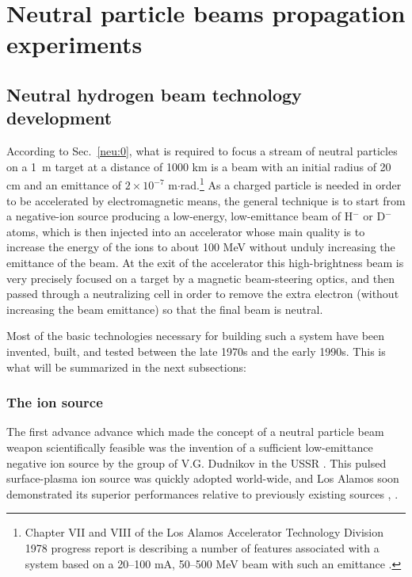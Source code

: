 \documentclass [12pt,a4paper,     ]{report} %
\begin{document}
\chapter{Neutral particle beams propagation experiments}
\label{npb:0}


\section{Neutral hydrogen beam technology development}
\label{nhb:0}

According to Sec.~\ref{neu:0}, what is required to focus a stream of neutral particles on a 1~m target at a distance of 1000 km is a beam with an initial radius of 20 cm and an emittance of $2 \times 10^{-7}$ m$\cdot$rad.\footnote{Chapter VII and VIII of the Los Alamos Accelerator Technology Division 1978 progress report is describing a number of features associated with a system based on a 20--100 mA, 50--500 MeV beam with such an emittance \cite[p.24-77]{KNAPP1980-}.} As a charged particle is needed in order to be accelerated by electromagnetic means, the general technique is to start from a negative-ion source producing a low-energy,  low-emittance beam of H$^-$ or D$^-$ atoms, which is then injected into an accelerator whose main quality is to increase the energy of the ions to about 100 MeV without unduly increasing the emittance of the beam.  At the exit of the accelerator this high-brightness beam is very precisely focused on a target by a magnetic beam-steering optics, and then passed through a neutralizing cell in order to remove the extra electron (without increasing the beam emittance) so that the final beam is neutral.

Most of the basic technologies necessary for building such a system have been invented, built, and tested between the late 1970s and the early 1990s.  This is what will be summarized in the next subsections:



\subsection{The ion source}

 The first advance advance which made the concept of a neutral particle beam weapon scientifically feasible was the invention of a sufficient low-emittance negative ion source by the group of V.G. Dudnikov in the USSR \cite{DUDNI1974-, DIMOV1977-}.  This pulsed surface-plasma ion source was quickly adopted world-wide, and Los Alamos soon demonstrated its superior performances relative to previously existing sources \cite[p.117]{KNAPP1982-}, \cite{SMITH1981-}.
\end{document}
